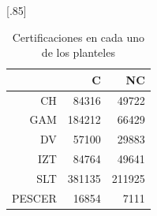 \documentclass[12pt]{article}
\begin{document}
\begin{table}[ht!]
\centering
\scalebox{0.75}[.85]{
\begin{tabular}{rrr}
  \hline
 & C & NC \\ 
  \hline
CH & 84316 & 49722 \\ 
  GAM & 184212 & 66429 \\ 
  DV & 57100 & 29883 \\ 
  IZT & 84764 & 49641 \\ 
  SLT & 381135 & 211925 \\ 
  PESCER & 16854 & 7111 \\ 
   \hline
\end{tabular}}
\caption{\label{Prob_Cert_Plantel}Certificaciones en cada uno de los planteles}
\end{table}
\end{document}
